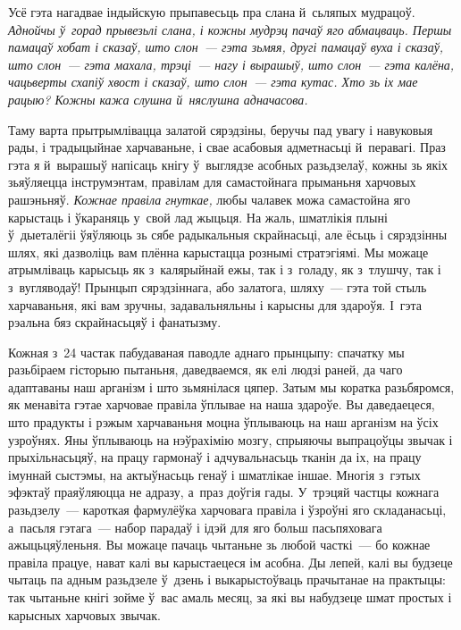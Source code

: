 Усё гэта нагадвае індыйскую прыпавесьць пра слана й~сьляпых мудрацоў. \emph{Аднойчы ў~горад прывезьлі слана, і кожны мудрэц пачаў яго абмацваць. Першы памацаў хобат і сказаў, што слон~--- гэта зьмяя, другі памацаў вуха і сказаў, што слон~--- гэта махала, трэці~--- нагу і вырашыў, што слон~--- гэта калёна, чацьверты схапіў хвост і сказаў, што слон~--- гэта кутас. Хто зь іх мае рацыю? Кожны кажа слушна й~няслушна адначасова.}

Таму варта прытрымлівацца залатой сярэдзіны, беручы пад увагу і навуковыя рады, і традыцыйнае харчаваньне, і свае асабовыя адметнасьці й~перавагі. Праз гэта я й~вырашыў напісаць кнігу ў~выглядзе асобных разьдзелаў, кожны зь якіх зьяўляецца інструмэнтам, правілам для самастойнага прыманьня харчовых рашэньняў. \emph{Кожнае правіла гнуткае,} любы чалавек можа самастойна яго карыстаць і ўкараняць у~свой лад жыцьця. На жаль, шматлікія плыні ў~дыеталёгіі ўяўляюць зь сябе радыкальныя скрайнасьці, але ёсьць і сярэдзінны шлях, які дазволіць вам плённа карыстацца рознымі стратэгіямі. Мы можаце атрымліваць карысьць як з~калярыйнай ежы, так і з~голаду, як з~тлушчу, так і з~вугляводаў! Прынцып сярэдзіннага, або залатога, шляху~--- гэта той стыль харчаваньня, які вам зручны, задавальняльны і карысны для здароўя. І~гэта рэальна бяз скрайнасьцяў і фанатызму.

Кожная з~24 частак пабудаваная паводле аднаго прынцыпу: спачатку мы разьбіраем гісторыю пытаньня, даведваемся, як елі людзі раней, да чаго адаптаваны наш арганізм і што зьмянілася цяпер. Затым мы коратка разьбяромся, як менавіта гэтае харчовае правіла ўплывае на наша здароўе. Вы даведаецеся, што прадукты і рэжым харчаваньня моцна ўплываюць на наш арганізм на ўсіх узроўнях. Яны ўплываюць на нэўрахімію мозгу, спрыяючы выпрацоўцы звычак і прыхільнасьцяў, на працу гармонаў і адчувальнасьць тканін да іх, на працу імуннай сыстэмы, на актыўнасьць генаў і шматлікае іншае. Многія з~гэтых эфэктаў праяўляюцца не адразу, а~праз доўгія гады. У~трэцяй частцы кожнага разьдзелу~--- кароткая фармулёўка харчовага правіла і ўзроўні яго складанасьці, а~пасьля гэтага~--- набор парадаў і ідэй для яго больш пасьпяховага ажыцьцяўленьня. Вы можаце пачаць чытаньне зь любой часткі~--- бо кожнае правіла працуе, нават калі вы карыстаецеся ім асобна. Ды лепей, калі вы будзеце чытаць па адным разьдзеле ў~дзень і выкарыстоўваць прачытанае на практыцы: так чытаньне кнігі зойме ў~вас амаль месяц, за які вы набудзеце шмат простых і карысных харчовых звычак.

